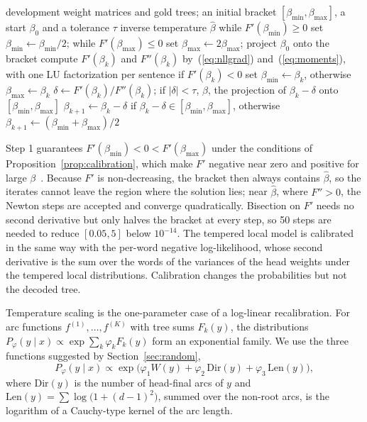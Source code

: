 \documentclass[mathematics,article,submit,pdftex,oneauthor]{Definitions/mdpi}
\begin{document}
\begin{Algorithm}\label{alg:calib}
\normalfont
\begin{algorithmic}[1]
\Require development weight matrices and gold trees; an initial bracket $[\beta_{\min},\beta_{\max}]$, a start $\beta_0$ and a tolerance $\tau$
\Ensure inverse temperature $\hat\beta$
\State while $F'(\beta_{\min})\geqslant0$ set $\beta_{\min}\gets\beta_{\min}/2$; while $F'(\beta_{\max})\leqslant0$ set $\beta_{\max}\gets2\beta_{\max}$; project $\beta_0$ onto the bracket
\State compute $F'(\beta_k)$ and $F''(\beta_k)$ by~(\ref{eq:nllgrad}) and~(\ref{eq:moments}), with one LU factorization per sentence
\State if $F'(\beta_k)<0$ set $\beta_{\min}\gets\beta_k$, otherwise $\beta_{\max}\gets\beta_k$
\State $\delta\gets F'(\beta_k)/F''(\beta_k)$; if $|\delta|<\tau$, \Return $\hat\beta$, the projection of $\beta_k-\delta$ onto $[\beta_{\min},\beta_{\max}]$
\State $\beta_{k+1}\gets\beta_k-\delta$ if $\beta_k-\delta\in[\beta_{\min},\beta_{\max}]$, otherwise $\beta_{k+1}\gets(\beta_{\min}+\beta_{\max})/2$
\EndFor
\end{algorithmic}
\end{Algorithm}

Step 1 guarantees $F'(\beta_{\min})<0<F'(\beta_{\max})$ under the conditions of Proposition~\ref{prop:calibration}, which make $F'$ negative near zero and positive for large $\beta$~\cite{Nocedal2006}.
Because $F'$ is non-decreasing, the bracket then always contains $\hat\beta$, so the iterates cannot leave the region where the solution lies; near $\hat\beta$, where $F''>0$, the Newton steps are accepted and converge quadratically.
Bisection on $F'$ needs no second derivative but only halves the bracket at every step, so 50 steps are needed to reduce $[0.05,5]$ below $10^{-14}$.
The tempered local model is calibrated in the same way with the per-word negative log-likelihood, whose second derivative is the sum over the words of the variances of the head weights under the tempered local distributions.
Calibration changes the probabilities but not the decoded tree.

Temperature scaling is the one-parameter case of a log-linear recalibration.
For arc functions $f^{(1)},\dots,f^{(K)}$ with tree sums $F_k(y)$, the distributions $P_\varphi(y\mid x)\propto\exp\sum_k\varphi_kF_k(y)$ form an exponential family.
We use the three functions suggested by Section~\ref{sec:random},
\begin{equation}\label{eq:loglinear}
P_\varphi(y\mid x)\propto\exp\bigl(\varphi_1W(y)+\varphi_2\,\mathrm{Dir}(y)+\varphi_3\,\mathrm{Len}(y)\bigr),
\end{equation}
where $\mathrm{Dir}(y)$ is the number of head-final arcs of $y$ and $\mathrm{Len}(y)=\sum\log\bigl(1+(d-1)^2\bigr)$, summed over the non-root arcs, is the logarithm of a Cauchy-type kernel of the arc length.
\end{document}
